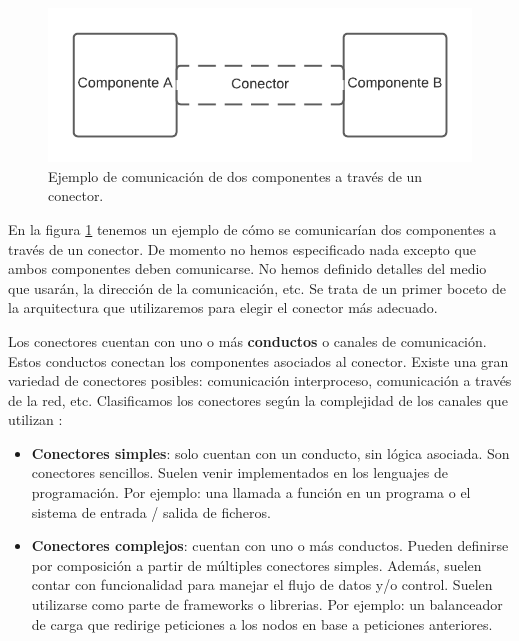 \begin{figure}[h]
  \centering
  \includegraphics{service_connectors/images/conector}
  \caption{Ejemplo de comunicación de dos componentes a través de un conector.}
  \label{fig:componentesEjemplo}
\end{figure}

En la figura \ref{fig:componentesEjemplo} tenemos un ejemplo de cómo se comunicarían dos componentes a través de un conector. De momento no hemos especificado nada excepto que ambos componentes deben comunicarse. No hemos definido detalles del medio que usarán, la dirección de la comunicación, etc. Se trata de un primer boceto de la arquitectura que utilizaremos para elegir el conector más adecuado.

Los conectores cuentan con uno o más \textbf{conductos} o canales de comunicación. Estos conductos conectan los componentes asociados al conector. Existe una gran variedad de conectores posibles: comunicación interproceso, comunicación a través de la red, etc. Clasificamos los conectores según la complejidad de los canales que utilizan \cite{mehtaTaxonomySoftwareConnectors2000}:

\begin{itemize}
    \item \textbf{Conectores simples}: solo cuentan con un conducto, sin lógica asociada. Son conectores sencillos. Suelen venir implementados en los lenguajes de programación. Por ejemplo: una llamada a función en un programa o el sistema de entrada / salida de ficheros.

    \item \textbf{Conectores complejos}: cuentan con uno o más conductos. Pueden definirse por composición a partir de múltiples conectores simples. Además, suelen contar con funcionalidad para manejar el flujo de datos y/o control. Suelen utilizarse como parte de frameworks o librerias. Por ejemplo: un balanceador de carga que redirige peticiones a los nodos en base a peticiones anteriores.
\end{itemize}

